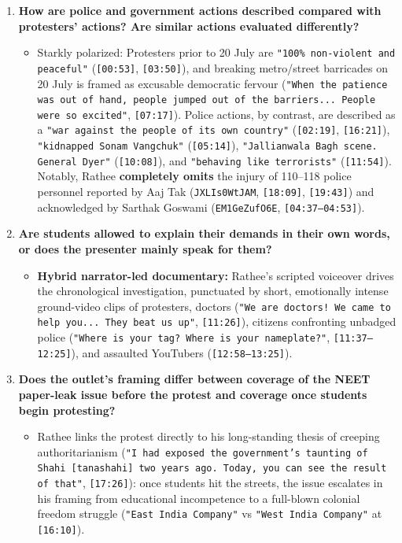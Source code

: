 \documentclass[10pt,a4paper]{article}
\begin{document}
\begin{enumerate}[leftmargin=1.6em, itemsep=4pt, topsep=4pt]
\begin{itemize}[leftmargin=1.4em, itemsep=2pt, topsep=2pt]
  \end{itemize}
  \item \textbf{How are police and government actions described compared with protesters' actions? Are similar actions evaluated differently?}
  \begin{itemize}[leftmargin=1.4em, itemsep=2pt, topsep=2pt]
    \item Starkly polarized: Protesters prior to 20 July are \texttt{"100\% non-violent and peaceful"} (\texttt{[00:53]}, \texttt{[03:50]}), and breaking metro/street barricades on 20 July is framed as excusable democratic fervour (\texttt{"When the patience was out of hand, people jumped out of the barriers... People were so excited"}, \texttt{[07:17]}). Police actions, by contrast, are described as a \texttt{"war against the people of its own country"} (\texttt{[02:19]}, \texttt{[16:21]}), \texttt{"kidnapped Sonam Vangchuk"} (\texttt{[05:14]}), \texttt{"Jallianwala Bagh scene. General Dyer"} (\texttt{[10:08]}), and \texttt{"behaving like terrorists"} (\texttt{[11:54]}). Notably, Rathee \textbf{completely omits} the injury of 110--118 police personnel reported by Aaj Tak (\texttt{JXLIs0WtJAM}, \texttt{[18:09]}, \texttt{[19:43]}) and acknowledged by Sarthak Goswami (\texttt{EM1GeZufO6E}, \texttt{[04:37--04:53]}).
  \end{itemize}
  \item \textbf{Are students allowed to explain their demands in their own words, or does the presenter mainly speak for them?}
  \begin{itemize}[leftmargin=1.4em, itemsep=2pt, topsep=2pt]
    \item \textbf{Hybrid narrator-led documentary:} Rathee's scripted voiceover drives the chronological investigation, punctuated by short, emotionally intense ground-video clips of protesters, doctors (\texttt{"We are doctors! We came to help you... They beat us up"}, \texttt{[11:26]}), citizens confronting unbadged police (\texttt{"Where is your tag? Where is your nameplate?"}, \texttt{[11:37--12:25]}), and assaulted YouTubers (\texttt{[12:58--13:25]}).
  \end{itemize}
  \item \textbf{Does the outlet's framing differ between coverage of the NEET paper-leak issue before the protest and coverage once students begin protesting?}
  \begin{itemize}[leftmargin=1.4em, itemsep=2pt, topsep=2pt]
    \item Rathee links the protest directly to his long-standing thesis of creeping authoritarianism (\texttt{"I had exposed the government's taunting of Shahi [tanashahi] two years ago. Today, you can see the result of that"}, \texttt{[17:26]}): once students hit the streets, the issue escalates in his framing from educational incompetence to a full-blown colonial freedom struggle (\texttt{"East India Company"} vs \texttt{"West India Company"} at \texttt{[16:10]}).
  \end{itemize}
\end{enumerate}
\end{document}
